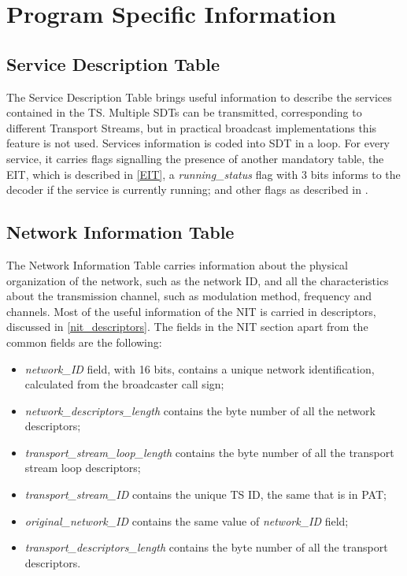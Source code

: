 \documentclass[
	12pt,				%
	openright,			%
	twoside,			%
	a4paper,			%
	brazil,
	french,				%
	english
	]{abntex2}
\begin{document}
\section{Program Specific Information}
\label{abnt_psi}

\subsection{Service Description Table}
\label{SDT}
The Service Description Table brings useful information to describe the services contained in the TS. Multiple SDTs can be transmitted, corresponding to different Transport Streams, but in practical broadcast implementations this feature is not used. Services information is coded into SDT in a loop. For every service, it carries flags signalling the presence of another mandatory table, the EIT, which is described in \autoref{EIT}, a \textit{running\_status} flag with 3 bits informs to the decoder if the service is currently running; and other flags as described in .

\subsection{Network Information Table}
\label{NIT}
The Network Information Table carries information about the physical organization of the network, such as the network ID, and all the characteristics about the transmission channel, such as modulation method, frequency and channels. Most of the useful information of the NIT is carried in descriptors, discussed in \autoref{nit_descriptors}. The fields in the NIT section apart from the common fields are the following:
\begin{itemize}
\item{\textit{network\_ID} field, with 16 bits, contains a unique network identification, calculated from the broadcaster call sign;}
\item{\textit{network\_descriptors\_length} contains the byte number of all the network descriptors;}
\item{\textit{transport\_stream\_loop\_length} contains the byte number of all the transport stream loop descriptors;}
\item{\textit{transport\_stream\_ID} contains the unique TS ID, the same that is in PAT;}
\item{\textit{original\_network\_ID}  contains the same value of \textit{network\_ID} field;}
\item{\textit{transport\_descriptors\_length} contains the byte number of all the transport descriptors.}
\end{itemize}
\end{document}
